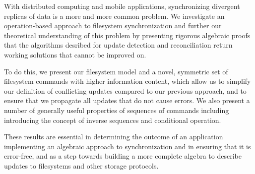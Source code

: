 
With distributed computing and mobile applications,
synchronizing divergent replicas of data is a more and more common problem.
We investigate an operation-based approach to filesystem synchronization
and further our theoretical understanding of this problem
by presenting rigorous algebraic proofs that the algorithms desribed for
update detection and reconciliation return working solutions
that cannot be improved on.

To do this, we present our filesystem model 
and a novel, symmetric set of filesystem commands
with higher information content,
which allow us to simplify our definition of conflicting updates
compared to our previous approach,
and to ensure that we propagate all updates that do not cause errors.
We also present a number of generally useful properties of sequences of commands
including introducing the concept of inverse sequences and conditional operation.

These results are essential in
determining the outcome of an
application implementing an algebraic approach to synchronization
and in ensuring that it is error-free,
and as a step towards building a more complete algebra
to describe updates to filesystems and other storage protocols.
